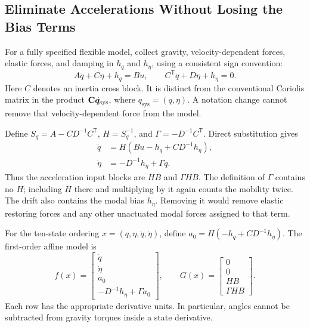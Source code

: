 \subsection{Eliminate Accelerations Without Losing the Bias Terms}

For a fully specified flexible model, collect gravity, velocity-dependent forces, elastic forces, and damping in $h_q$ and $h_\eta$, using a consistent sign convention:
\begin{equation}
 A\ddot q+C\ddot\eta+h_q=Bu,\qquad
 C^{\mathsf T}\ddot q+D\ddot\eta+h_\eta=0.
\end{equation}
Here $C$ denotes an inertia cross block. It is distinct from the conventional Coriolis matrix in the product $\mathbf{C}\dot{\bm{q}}_{\text{sys}}$, where $q_{\mathrm{sys}}=(q,\eta)$. A notation change cannot remove that velocity-dependent force from the model.

Define $S_q=A-CD^{-1}C^{\mathsf T}$, $H=S_q^{-1}$, and $\Gamma=-D^{-1}C^{\mathsf T}$. Direct substitution gives
\begin{equation}
\begin{aligned}
 \ddot q&=H(Bu-h_q+CD^{-1}h_\eta),\\
 \ddot\eta&=-D^{-1}h_\eta+\Gamma\ddot q.
\end{aligned}
\end{equation}
Thus the acceleration input blocks are $HB$ and $\Gamma HB$. The definition of $\Gamma$ contains no $H$; including $H$ there and multiplying by it again counts the mobility twice. The drift also contains the modal bias $h_\eta$. Removing it would remove elastic restoring forces and any other unactuated modal forces assigned to that term.

For the ten-state ordering $x=(q,\eta,\dot q,\dot\eta)$, define $a_0=H(-h_q+CD^{-1}h_\eta)$. The first-order affine model is
\begin{equation}
 f(x)=\begin{bmatrix}\dot q\\\dot\eta\\a_0\\-D^{-1}h_\eta+\Gamma a_0\end{bmatrix},\qquad
 G(x)=\begin{bmatrix}0\\0\\HB\\\Gamma HB\end{bmatrix}.
\end{equation}
Each row has the appropriate derivative units. In particular, angles cannot be subtracted from gravity torques inside a state derivative.

